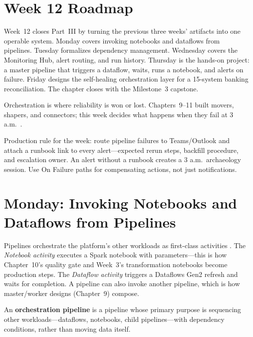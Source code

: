\section{Week 12 Roadmap}
Week~12 closes Part~III by turning the previous three weeks' artifacts into one operable system. Monday covers invoking notebooks and dataflows from pipelines. Tuesday formalizes dependency management. Wednesday covers the Monitoring Hub, alert routing, and run history. Thursday is the hands-on project: a master pipeline that triggers a dataflow, waits, runs a notebook, and alerts on failure. Friday designs the self-healing orchestration layer for a 15-system banking reconciliation. The chapter closes with the Milestone~3 capstone.

Orchestration is where reliability is won or lost. Chapters~9--11 built movers, shapers, and connectors; this week decides what happens when they fail at 3 a.m.\ \cite{microsoftFabricMonitoringHub,microsoftFabricPipelines}.

\begin{notebox}
Production rule for the week: route pipeline failures to Teams/Outlook and attach a runbook link to every alert---expected rerun steps, backfill procedure, and escalation owner. An alert without a runbook creates a 3 a.m.\ archaeology session. Use On Failure paths for compensating actions, not just notifications.
\end{notebox}

\section{Monday: Invoking Notebooks and Dataflows from Pipelines}
Pipelines orchestrate the platform's other workloads as first-class activities \cite{microsoftFabricPipelines}. The \emph{Notebook activity} executes a Spark notebook with parameters---this is how Chapter~10's quality gate and Week~3's transformation notebooks become production steps. The \emph{Dataflow activity} triggers a Dataflows Gen2 refresh and waits for completion. A pipeline can also invoke another pipeline, which is how master/worker designs (Chapter~9) compose.

\begin{definitionbox}
An \textbf{orchestration pipeline} is a pipeline whose primary purpose is sequencing other workloads---dataflows, notebooks, child pipelines---with dependency conditions, rather than moving data itself.
\end{definitionbox}

